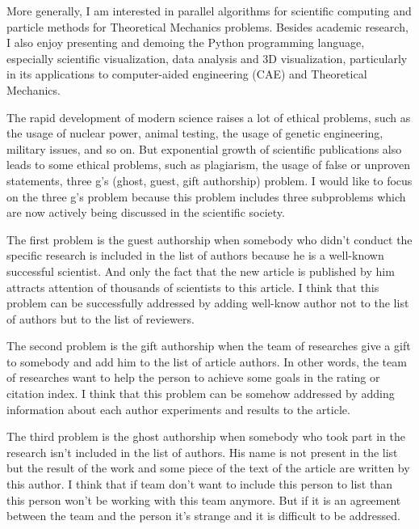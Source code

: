 \documentclass[main.tex]{subfiles}
\begin{document}
More generally, I am interested in parallel algorithms for scientific computing and particle methods for Theoretical Mechanics problems.
Besides academic research, I also enjoy presenting and demoing the Python programming language, especially scientific visualization, data analysis and 3D visualization, particularly in its applications to computer-aided engineering (CAE) and Theoretical Mechanics.
\\


\newpage


\setcounter{subsection}{3}

The rapid development of modern science raises a lot of ethical problems, such as the usage of nuclear power, animal testing, the usage of genetic engineering, military issues, and so on.
But exponential growth of scientific publications also leads to some ethical problems, such as plagiarism, the usage of false or unproven statements, three g's (ghost, guest, gift authorship) problem.
I would like to focus on the three g's problem because this problem includes three subproblems which are now actively being discussed in the scientific society.

The first problem is the guest authorship when somebody who didn't conduct the specific research is included in the list of authors because he is a well-known successful scientist.
And only the fact that the new article is published by him attracts attention of thousands of scientists to this article.
I think that this problem can be successfully addressed by adding well-know author not to the list of authors but to the list of reviewers.

The second problem is the gift authorship when the team of researches give a gift to somebody and add him to the list of article authors.
In other words, the team of researches want to help the person to achieve some goals in the rating or citation index. I think that this problem can be somehow addressed by adding information about each author experiments and results to the article.

The third problem is the ghost authorship when somebody who took part in the research isn't included in the list of authors. His name is not present in the list but the result of the work and some piece of the text of the article are written by this author.
I think that if team don't want to include this person to list than this person won't be working with this team anymore.
But if it is an agreement between the team and the person it's strange and it is difficult to be addressed.
\end{document}
